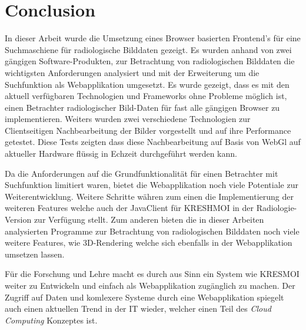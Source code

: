 
\section{Conclusion}
\label{sec:conclusion}
In dieser Arbeit wurde die Umsetzung eines Browser basierten Frontend's für eine Suchmaschiene für radiologische Bilddaten gezeigt.
Es wurden anhand von zwei gängigen Software-Produkten,
zur Betrachtung von radiologischen Bilddaten die wichtigsten Anforderungen analysiert und mit der Erweiterung um die Suchfunktion als Webapplikation umgesetzt.
Es wurde gezeigt, dass es mit den aktuell verfügbaren Technologien und Frameworks ohne Probleme möglich ist,
einen Betrachter radiologischer Bild-Daten für fast alle gängigen Browser zu implementieren.
Weiters wurden zwei verschiedene Technologien zur Clientseitigen Nachbearbeitung der Bilder vorgestellt und auf ihre Performance getestet.
Diese Tests zeigten dass diese Nachbearbeitung auf Basis von WebGl auf aktueller Hardware flüssig in Echzeit durchgeführt werden kann.

Da die Anforderungen auf die Grundfunktionalität für einen Betrachter mit Suchfunktion limitiert waren,
bietet die Webapplikation noch viele Potentiale zur Weiterentwicklung.
Weitere Schritte währen zum einen die Implementierung der weiteren Features welche auch der JavaClient für KRESHMOI in der Radiologie-Version zur Verfügung stellt.
Zum anderen bieten die in dieser Arbeiten analysierten Programme zur Betrachtung von radiologischen Bilddaten noch viele weitere Features,
wie 3D-Rendering welche sich ebenfalls in der Webapplikation umsetzen lassen.

Für die Forschung und Lehre macht es durch aus Sinn ein System wie KRESMOI weiter zu Entwickeln und einfach als Webapplikation zugänglich zu machen.
Der Zugriff auf Daten und komlexere Systeme durch eine Webapplikation spiegelt auch einen aktuellen Trend in der IT wieder, 
welcher einen Teil des \textit{Cloud Computing} Konzeptes ist.

